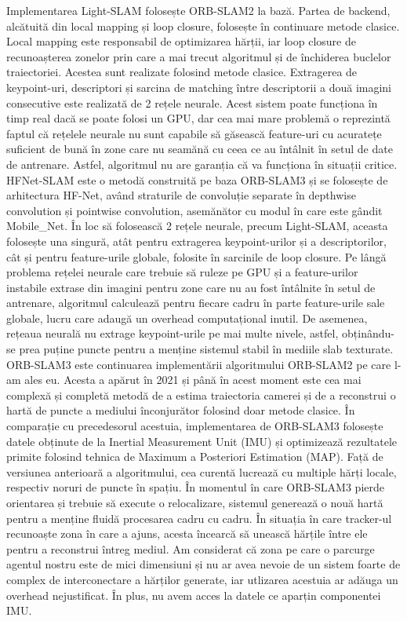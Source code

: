 \documentclass[12pt,a4paper]{report}
\begin{document}
Implementarea Light-SLAM folosește ORB-SLAM2 la bază. Partea de backend,
alcătuită din local mapping și loop closure, folosește în continuare metode clasice. Local mapping
este responsabil de optimizarea hărții, iar loop closure de recunoașterea
zonelor prin care a mai trecut algoritmul și de închiderea buclelor traiectoriei. Acestea sunt 
realizate folosind metode clasice. Extragerea de keypoint-uri, descriptori și sarcina de 
matching între descriptorii a două imagini consecutive este realizată de 2 rețele neurale.
Acest sistem poate funcționa în timp real dacă se poate folosi un GPU, dar cea mai mare 
problemă o reprezintă faptul că rețelele neurale nu sunt capabile să găsească feature-uri cu
acuratețe suficient de bună în zone care nu seamănă cu ceea ce au întâlnit în setul de date
 de antrenare. Astfel, algoritmul nu are garanția că va funcționa în situații critice.\\

HFNet-SLAM este o metodă construită pe baza ORB-SLAM3 și se folosește de arhitectura HF-Net, 
având straturile de convoluție separate în depthwise convolution și pointwise convolution, 
asemănător cu modul în care este gândit Mobile\_Net. În loc să folosească 2 rețele neurale, 
precum Light-SLAM, aceasta folosește una singură, atât pentru extragerea keypoint-urilor și a
descriptorilor, cât și pentru feature-urile globale, folosite în sarcinile de loop closure. 
Pe lângă problema rețelei neurale care trebuie să ruleze pe GPU și a feature-urilor instabile 
extrase din imagini pentru zone care nu au fost întâlnite în setul de antrenare, algoritmul
calculează pentru fiecare cadru în parte feature-urile sale globale, lucru care adaugă un 
overhead computațional inutil. De asemenea, rețeaua neurală nu extrage keypoint-urile
pe mai multe nivele, astfel, obținându-se prea puține puncte pentru a menține sistemul stabil 
în mediile slab texturate. \\

ORB-SLAM3 este continuarea implementării algoritmului ORB-SLAM2 pe care l-am ales eu.
Acesta a apărut în 2021 și până în acest moment este cea mai complexă și completă metodă de a
estima traiectoria camerei și de a reconstrui o hartă de puncte a mediului înconjurător folosind 
doar metode clasice. În comparație cu precedesorul acestuia, implementarea de ORB-SLAM3 folosește
datele obținute de la Inertial Measurement Unit (IMU) și optimizează rezultatele primite 
folosind tehnica de Maximum a Posteriori Estimation (MAP). Față de versiunea anterioară a algoritmului, cea
curentă lucrează cu multiple hărți locale, respectiv noruri
de puncte în spațiu. În momentul în care ORB-SLAM3 pierde orientarea și trebuie să execute 
o relocalizare, sistemul generează o nouă hartă pentru a menține fluidă procesarea cadru 
cu cadru. În situația în care tracker-ul recunoaște zona în care a ajuns, acesta încearcă să unească 
hărțile între ele pentru a reconstrui întreg mediul. Am considerat că zona pe care o parcurge 
agentul nostru este de mici dimensiuni și nu ar avea nevoie de un sistem foarte de 
complex de interconectare a hărților generate, iar utlizarea acestuia ar adăuga un overhead
nejustificat. În plus, nu avem acces la datele ce aparțin componentei IMU.\@ \\
\end{document}

